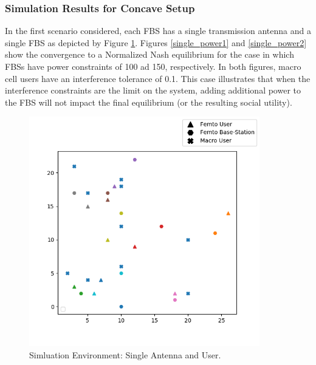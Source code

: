 \documentclass[12pt,a4paper]{report}
\begin{document}
\subsubsection{Simulation Results for Concave Setup}

In the first scenario considered, each FBS has a single transmission antenna and a single FBS as depicted by Figure \ref{system_figure_single}. Figures \ref{single_power1} and \ref{single_power2} show the convergence to a Normalized Nash equilibrium for the case in which FBSs have power constraints of 100 ad 150, respectively. In both figures, macro cell users have an interference tolerance of 0.1. This case illustrates that when the interference constraints are the limit on the system, adding additional power to the FBS will not impact the final equilibrium (or the resulting social utility). 

\begin{figure}[H]\label{system_figure_single}
	\includegraphics[width=\textwidth,height = 10cm]{figures/system_figure_single}
	  \caption{Simluation Environment: Single Antenna and User.}
\end{figure}
\end{document}
